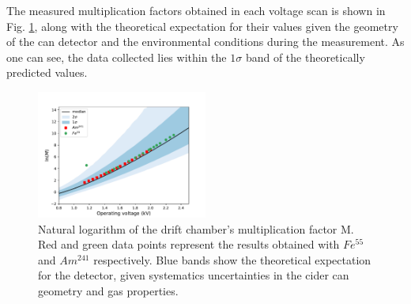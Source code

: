 



The measured multiplication factors obtained in each voltage scan is shown in Fig. \ref{final_lnm}, along with the theoretical expectation for their values given the geometry of the can detector and the environmental conditions during the measurement. As one can see, the data collected lies within the $1\sigma$ band of the theoretically predicted values.

\begin{figure}[htb]
  \includegraphics[width=0.5\textwidth]{graphics/lnM_final_plot.pdf}
  \caption{Natural logarithm of the drift chamber's multiplication factor M. Red and green data points represent the results obtained with $Fe^{55}$ and $Am^{241}$ respectively. Blue bands show the theoretical expectation for the detector, given systematics uncertainties in the cider can geometry and gas properties.}
  \label{final_lnm}
\end{figure}
